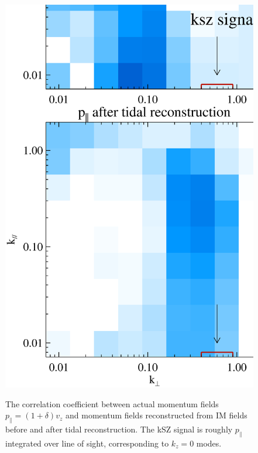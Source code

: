 \begin{figure}[btp]
\begin{minipage}[t]{0.33\linewidth}
\label{fig:v}
\end{minipage}
\begin{minipage}[t]{0.33\linewidth}
\begin{center}
\includegraphics[width=\textwidth,height=1.7\textwidth]{figure/powmomen_before_after_tide.eps}
\end{center}
\vspace{-0.7cm}
\label{fig:p}
\caption{The correlation coefficient between actual momentum fields $p_\parallel=(1+\delta)v_z$ and momentum fields reconstructed from 
IM fields before and 
after tidal reconstruction. 
The kSZ signal is roughly $p_\parallel$ integrated over line of sight, 
corresponding to $k_z=0$ modes. }
\end{minipage}
\end{figure}
